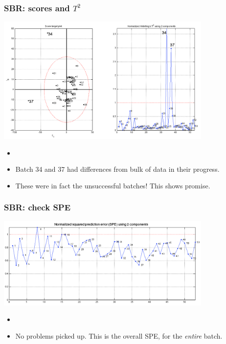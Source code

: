 \begin{frame}\frametitle{SBR: scores and \( T^2 \)}
	
	\begin{center}
		\includegraphics[width=0.8\textwidth]{images/sbr/SBR-scores-and-T2.png}
	\end{center}

	\begin{itemize}
		\item	{}
		
		\item	Batch 34 and 37 had differences from bulk of data in their progress.\pause
		
		\item	These were in fact the unsuccessful batches!  This shows promise.
	\end{itemize}

\end{frame}

\begin{frame}\frametitle{SBR: check SPE}
	
	\begin{center}
		\includegraphics[width=0.8\textwidth]{images/sbr/SBR-SPE-plot-per-batch.png}
	\end{center}

	\begin{itemize}
		\item	{}
		
		\item	No problems picked up.  This is the overall SPE, for the \emph{entire} batch.
	\end{itemize}

\end{frame}

